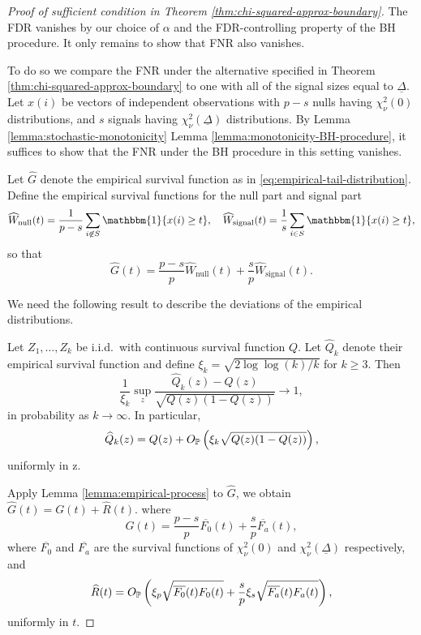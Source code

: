 \begin{proof}[Proof of sufficient condition in Theorem \ref{thm:chi-squared-approx-boundary}]
The FDR vanishes by our choice of $\alpha$ and the FDR-controlling property of the BH procedure.
It only remains to show that FNR also vanishes.

To do so we compare the FNR under the alternative specified in Theorem \ref{thm:chi-squared-approx-boundary} to one with all of the signal sizes equal to $\underline{\Delta}$.
Let $x(i)$ be vectors of independent observations with $p-s$ nulls having $\chi^2_\nu(0)$ distributions, and $s$ signals having $\chi^2_\nu(\underline{\Delta})$ distributions.
By Lemma \ref{lemma:stochastic-monotonicity} Lemma \ref{lemma:monotonicity-BH-procedure}, it suffices to show that the FNR under the BH procedure in this setting vanishes.

Let $\widehat{G}$ denote the empirical survival function as in \eqref{eq:empirical-tail-distribution}.
Define the empirical survival functions for the null part and signal part
\begin{equation} \label{eq:empirical-survival-null-signal}
    \widehat{W}_\text{null}(t) = \frac{1}{p-s}\sum_{i\not\in S}\mathbbm{1}\{x(i) \ge t\},
    \quad
    \widehat{W}_\text{signal}(t) = \frac{1}{s}\sum_{i\in S}\mathbbm{1}\{x(i) \ge t\},
\end{equation}
so that
$$
\widehat{G}(t) = \frac{p-s}{p}\widehat{W}_\text{null}(t) + \frac{s}{p}\widehat{W}_\text{signal}(t).
$$

We need the following result to describe the deviations of the empirical distributions.
\begin{lemma} \label{lemma:empirical-process}
Let $Z_1,\ldots,Z_k$ be i.i.d.\ with continuous survival function $Q$.
Let $\widehat{Q}_k$ denote their empirical survival function and define 
$\xi_k = \sqrt{2\log{\log{(k)}}/k}$ for $k \ge 3$. 
Then
$$
\frac{1}{\xi_k}\sup_z\frac{\widehat{Q}_k(z) - Q(z)}{\sqrt{Q(z)(1 - Q(z))}} \to 1,
$$
in probability as $k \to \infty$.
In particular,
$$
\widehat{Q}_k(z) = Q(z) + O_\P\left(\xi_k\sqrt{Q(z)(1 - Q(z))}\right),
$$
uniformly in z.
\end{lemma}

Apply Lemma \ref{lemma:empirical-process} to $\widehat{G}$, we obtain
$\widehat{G}(t) = G(t) + \widehat{R}(t)$.
where 
\begin{equation} \label{eq:empirical-process-mean}
    G(t) = \frac{p-s}{p}\overline{F_0}(t) + \frac{s}{p}\overline{F_a}(t),
\end{equation}
where $\overline{F_0}$ and $\overline{F_{a}}$ are the survival functions of $\chi_\nu^2(0)$ and $\chi_\nu^2(\underline{\Delta})$ respectively, and 
\begin{equation} \label{eq:empirical-process-residual}
    \widehat{R}(t) = O_\P\left(\xi_p\sqrt{\overline{F_0}(t)F_0(t)} + \frac{s}{p}\xi_s\sqrt{\overline{F_a}(t)F_a(t)}\right),
\end{equation}
uniformly in $t$.


\end{proof}
